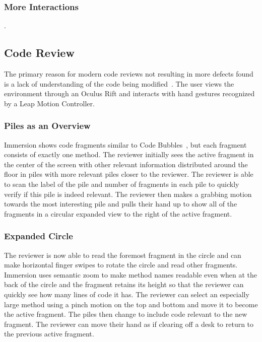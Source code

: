 \documentclass[conference]{IEEEtran}
\begin{document}
\subsubsection{More Interactions}.

\subsection{Code Review}

The primary reason for modern code reviews not resulting in more defects found is a lack of understanding of the code being modified~\cite{bacchelli:ModernCodeReviewChallenges}. 
The user views the environment through an Oculus Rift and interacts with hand gestures recognized by a Leap Motion Controller.

\subsubsection{Piles as an Overview}
Immersion shows code fragments similar to Code Bubbles~\cite{Bragdon:CodeBubbles}, but each fragment consists of exactly one method.  
The reviewer initially sees the active fragment in the center of the screen with other relevant information distributed around the floor in piles with more relevant piles closer to the reviewer. 
The reviewer is able to scan the label of the pile and number of fragments in each pile to quickly verify if this pile is indeed relevant. 
The reviewer then makes a grabbing motion towards the most interesting pile and pulls their hand up to show all of the fragments in a circular expanded view to the right of the active fragment.

\subsubsection{Expanded Circle}
The reviewer is now able to read the foremost fragment in the circle and can make horizontal finger swipes to rotate the circle and read other fragments. 
Immersion uses semantic zoom to make method names readable even when at the back of the circle and the fragment retains its height so that the reviewer can quickly see how many lines of code it has. 
The reviewer can select an especially large method using a pinch motion on the top and bottom and move it to become the active fragment. 
The piles then change to include code relevant to the new fragment. 
The reviewer can move their hand as if clearing off a desk to return to the previous active fragment.
\end{document}
